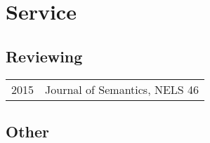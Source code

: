 \documentclass[11pt,letterpaper,twoside]{article}
\makeatletter
\newcommand{\myvrule}{\color{lightgray}\vrule width 1.0pt}
\newenvironment{cvsection}{%
  \renewcommand{\arraystretch}{1.75}
  \begin{longtable}[l]{@{} L R @{}}
}{%
  \end{longtable}
}
\makeatother
\begin{document}
\clearpage

\section*{Service}

\subsection*{Reviewing}

\begin{cvsection}
  2015 & Journal of Semantics, NELS 46
\end{cvsection}

\subsection*{Other}
\end{document}
